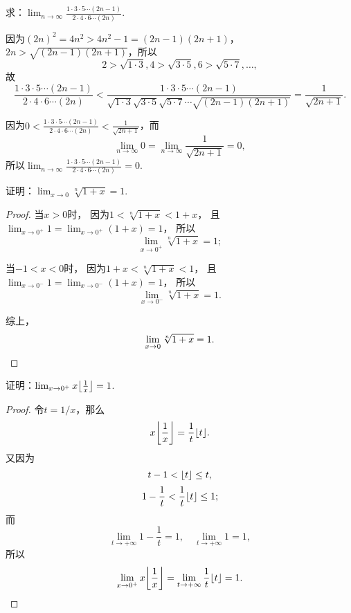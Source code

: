 \begin{example}
求：\(\lim_{n\to\infty}\frac{1 \cdot 3 \cdot 5 \dotsm (2n-1)}{2 \cdot 4 \cdot 6 \dotsm (2n)}\).
\begin{solution}
因为\((2n)^2 = 4n^2 > 4n^2-1 = (2n-1)(2n+1)\)，\(2n > \sqrt{(2n-1)(2n+1)}\)，所以\[
2 > \sqrt{1 \cdot 3},
4 > \sqrt{3 \cdot 5},
6 > \sqrt{5 \cdot 7},
\dotsc,
\]故\[
\frac{1 \cdot 3 \cdot 5 \dotsm (2n-1)}{2 \cdot 4 \cdot 6 \dotsm (2n)}
< \frac{1 \cdot 3 \cdot 5 \dotsm (2n-1)}{\sqrt{1 \cdot 3} \sqrt{3 \cdot 5} \sqrt{5 \cdot 7} \dotsm \sqrt{(2n-1)(2n+1)}}
= \frac{1}{\sqrt{2n+1}}.
\]

因为\(0 < \frac{1 \cdot 3 \cdot 5 \dotsm (2n-1)}{2 \cdot 4 \cdot 6 \dotsm (2n)} < \frac{1}{\sqrt{2n+1}}\)，而\[
\lim_{n\to\infty}0 = \lim_{n\to\infty}\frac{1}{\sqrt{2n+1}} = 0,
\]所以\(\lim_{n\to\infty}\frac{1 \cdot 3 \cdot 5 \dotsm (2n-1)}{2 \cdot 4 \cdot 6 \dotsm (2n)} = 0\).
\end{solution}
\end{example}

\begin{example}
证明：\(\lim_{x\to0} \sqrt[n]{1+x} = 1\).
\begin{proof}
当\(x > 0\)时，
因为\(1 < \sqrt[n]{1+x} < 1+x\)，
且\(\lim_{x\to0^+} 1 = \lim_{x\to0^+}(1+x) = 1\)，
所以\[
	\lim_{x\to0^+} \sqrt[n]{1+x} = 1;
\]

当\(-1 < x < 0\)时，
因为\(1+x < \sqrt[n]{1+x} < 1\)，
且\(\lim_{x\to0^-} 1 = \lim_{x\to0^-}(1+x) = 1\)，
所以\[
	\lim_{x\to0^-} \sqrt[n]{1+x} = 1.
\]

综上，\[
	\lim_{x\to0} \sqrt[n]{1+x} = 1.
	\qedhere
\]
\end{proof}
\end{example}

\begin{example}
证明：\(\lim_{x\to0^+} x \floor*{\frac{1}{x}} = 1\).
\begin{proof}
令\(t=1/x\)，那么\[
x \floor*{\frac{1}{x}} = \frac{1}{t} \floor{t}.
\]又因为\[
t - 1 < \lfloor t\rfloor \leq t,
\]\[
1 - \frac{1}{t} < \frac{1}{t} \lfloor t\rfloor \leq 1;
\]而\[
\lim_{t\to+\infty} 1 - \frac{1}{t} = 1,
\quad
\lim_{t\to+\infty} 1 = 1,
\]所以\[
\lim_{x\to0^+} x \floor*{\frac{1}{x}} = \lim_{t\to+\infty} \frac{1}{t} \floor{t} = 1.
\qedhere
\]
\end{proof}
\end{example}

